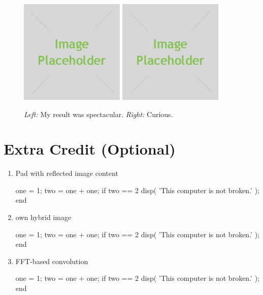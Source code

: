 \begin{figure}[h]
    \centering
    \includegraphics[width=5cm]{placeholder.jpg}
    \includegraphics[width=5cm]{placeholder.jpg}
    \caption{\emph{Left:} My result was spectacular. \emph{Right:} Curious.}
    \label{fig:result1}
\end{figure}

\section*{Extra Credit (Optional)}
\begin{enumerate}
   
    \item Pad with reflected image content
        \begin{python}
        one = 1;
        two = one + one;
        if two == 2
            disp( 'This computer is not broken.' );
        end
        \end{python}
    
    \item own hybrid image
        \begin{python}
        one = 1;
        two = one + one;
        if two == 2
            disp( 'This computer is not broken.' );
        end
        \end{python} 

    \item FFT-based convolution
        \begin{python}
        one = 1;
        two = one + one;
        if two == 2
            disp( 'This computer is not broken.' );
        end
        \end{python} 
\end{enumerate}


